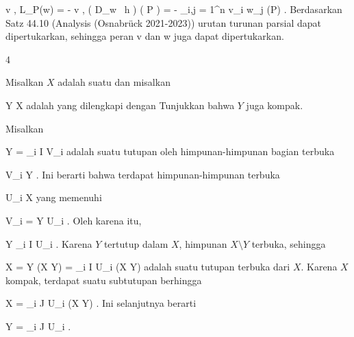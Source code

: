{\mavergleichskettealign
{\vergleichskettealign
{ \left\langle  v  ,  L_P(w)  \right\rangle
}
{ =} { - {  } \left\langle  v  ,  \left(  D_{w}
 \,  h   \right) \left(   P   \right)   \right\rangle
}
{ =} { -  {  }  \sum_{i,j = 1}^n v_i  w_j  {  } {  }  (P)
}
{ } {
}
{ } {
}
}
{}
{}{.}
Berdasarkan
Satz 44.10 (Analysis (Osnabrück 2021-2023))
urutan turunan parsial dapat dipertukarkan, sehingga peran
\mathkor {} {v} {dan} {w} {}
juga dapat dipertukarkan.

 }



{4}

{

Misalkan $X$ adalah suatu
dan misalkan

\mavergleichskette
{\vergleichskette
{Y
}
{ \subseteq }{ X
}
{  }{
}
{    }{
}
{   }{
}
}
{}{}{}
adalah
yang dilengkapi dengan
Tunjukkan bahwa $Y$ juga kompak.

}
{

Misalkan

\mavergleichskettedisp
{\vergleichskette
{ Y
}
{ =} { \bigcup_{i \in I} V_i
}
{ } {
}
{ } {
}
{ } {
}
}
{}{}{}
adalah suatu tutupan oleh himpunan-himpunan bagian terbuka

\mavergleichskette
{\vergleichskette
{ V_i
}
{ \subseteq }{ Y
}
{  }{
}
{    }{
}
{   }{
}
}
{}{}{.}
Ini berarti bahwa terdapat himpunan-himpunan terbuka

\mavergleichskette
{\vergleichskette
{ U_i
}
{ \subseteq }{ X
}
{  }{
}
{    }{
}
{   }{
}
}
{}{}{}
yang memenuhi

\mavergleichskette
{\vergleichskette
{ V_i
}
{ = }{ Y \cap U_i
}
{  }{
}
{    }{
}
{   }{
}
}
{}{}{.}
Oleh karena itu,

\mavergleichskettedisp
{\vergleichskette
{ Y
}
{ \subseteq} { \bigcup_{i \in I} U_i
}
{ } {
}
{ } {
}
{ } {
}
}
{}{}{.}
Karena $Y$ tertutup dalam $X$, himpunan $X \setminus Y$ terbuka, sehingga

\mavergleichskettedisp
{\vergleichskette
{ X
}
{ =} { Y \cup (X \setminus Y)
}
{ =} { \bigcup_{i \in I} U_i  \cup  (X \setminus Y)
}
{ } {
}
{ } {
}
}
{}{}{}
adalah suatu tutupan terbuka dari $X$. Karena $X$ kompak, terdapat suatu subtutupan berhingga

\mavergleichskettedisp
{\vergleichskette
{ X
}
{ =} { \bigcup_{i \in J} U_i  \cup  (X \setminus Y)
}
{ } {
}
{ } {
}
{ } {}
}
{}{}{.}
Ini selanjutnya berarti

\mavergleichskettedisp
{\vergleichskette
{ Y
}
{ =} { \bigcup_{i \in J} U_i
}
{ } {
}
{ } {
}
{ } {}
}
{}{}{.}

 }



